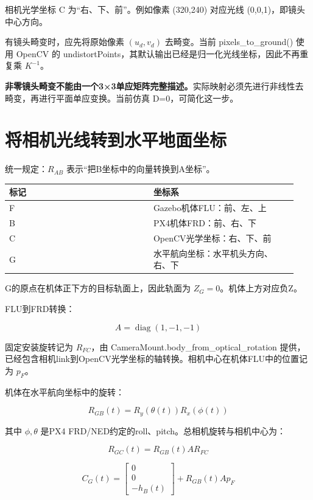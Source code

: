 \documentclass[UTF8,a4paper,11pt,fontset=windows]{ctexart}
\begin{document}
相机光学坐标 C 为“右、下、前”。例如像素 (320,240) 对应光线 (0,0,1)，即镜头中心方向。


有镜头畸变时，应先将原始像素 \((u_d,v_d)\) 去畸变。当前 pixels\_to\_ground() 使用 OpenCV 的 undistortPoints，其默认输出已经是归一化光线坐标，因此不再重复乘 \(K^{-1}\)。


\textbf{非零镜头畸变不能由一个3×3单应矩阵完整描述。}实际映射必须先进行非线性去畸变，再进行平面单应变换。当前仿真 D=0，可简化这一步。


\section{将相机光线转到水平地面坐标}

统一规定：\(R_{AB}\) 表示“把B坐标中的向量转换到A坐标”。


{\small\setlength{\tabcolsep}{3pt}\begin{longtable}{>{\raggedright\arraybackslash}p{0.47\linewidth}>{\raggedright\arraybackslash}p{0.47\linewidth}}\toprule
\textbf{标记} & \textbf{坐标系}\\\midrule\endhead
F & Gazebo机体FLU：前、左、上\\
B & PX4机体FRD：前、右、下\\
C & OpenCV光学坐标：右、下、前\\
G & 水平航向坐标：水平机头方向、右、下\\
\bottomrule\end{longtable}}

G的原点在机体正下方的目标轨面上，因此轨面为 \(Z_G=0\)。机体上方对应负Z。


FLU到FRD转换：


\[
A=\operatorname{diag}(1,-1,-1)
\]

固定安装旋转记为 \(R_{FC}\)，由 CameraMount.body\_from\_optical\_rotation 提供，已经包含相机link到OpenCV光学坐标的轴转换。相机中心在机体FLU中的位置记为 \(p_F\)。


机体在水平航向坐标中的旋转：


\[
R_{GB}(t)=R_y(\theta(t))R_x(\phi(t))
\]

其中 \(\phi,\theta\) 是PX4 FRD/NED约定的roll、pitch。总相机旋转与相机中心为：


\[
R_{GC}(t)=R_{GB}(t)A R_{FC}
\]

\[
C_G(t)=\begin{bmatrix}0\\0\\-h_B(t)\end{bmatrix}+R_{GB}(t)A p_F
\]
\end{document}

